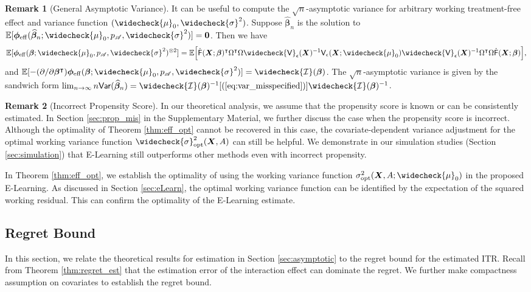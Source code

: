 \documentclass[11pt]{article}
\theoremstyle{definition}
\newtheorem*{rmk}{Remark}
\theoremstyle{remark}
\newcommand{\bX}{\bm{X}}
\newcommand{\bbeta}{\bm{\beta}}
\newcommand{\bphi}{\bm{\phi}}
\newcommand{\bbE}{\mathbb{E}}
\newcommand{\cI}{\mathcal{I}}
\newcommand{\sA}{\mathscr{A}}
\newcommand{\sfF}{\mathsf{F}}
\newcommand{\sfV}{\mathsf{V}}
\newcommand{\sfvar}{\mathsf{Var}}
\newcommand{\bzero}{\mathbf{0}}	%
\newcommand{\eff}{\mathrm{eff}}
\newcommand{\opt}{\mathrm{opt}}
\begin{document}
\begin{rmk}[General Asymptotic Variance]
	It can be useful to compute the $ \sqrt{n} $-asymptotic variance for arbitrary working treatment-free effect and variance function $ (\widecheck{\mu}_{0},\widecheck{\sigma}^{2}) $. Suppose $ \widehat{\bbeta}_{n} $ is the solution to $ \bbE[\bphi_{\eff}(\widehat{\bbeta}_{n};\widecheck{\mu}_{0},p_{\sA},\widecheck{\sigma}^{2})] = \bzero $. Then we have
	\begin{align}
		\bbE[\bphi_{\eff}(\bbeta;\widecheck{\mu}_{0},p_{\sA},\widecheck{\sigma}^{2})^{\otimes 2}] = \bbE\Big[ \dot{\sfF}(\bX;\bbeta)^{\intercal}\Omega^{\intercal}\Omega\widecheck{\sfV}_{\epsilon}(\bX)^{-1} \sfV_{\epsilon}(\bX;\widecheck{\mu}_{0}) \widecheck{\sfV}_{\epsilon}(\bX)^{-1}\Omega^{\intercal}\Omega\dot{\sfF}(\bX;\bbeta) \Big],\label{eq:var_misspecified}
	\end{align}
	and $ \bbE[-(\partial/\partial\bbeta^{\intercal})\bphi_{\eff}(\bbeta;\widecheck{\mu}_{0},p_{\sA},\widecheck{\sigma}^{2})] = \widecheck{\cI}(\bbeta) $. The $ \sqrt{n} $-asymptotic variance is given by the sandwich form $ \lim_{n\to\infty}n\sfvar(\widehat{\bbeta}_{n}) = \widecheck{\cI}(\bbeta)^{-1}[(\ref{eq:var_misspecified})]\widecheck{\cI}(\bbeta)^{-1} $.
\end{rmk}

\begin{rmk}[Incorrect Propensity Score] 
	In our theoretical analysis, we assume that the propensity score is known or can be consistently estimated. In Section \ref{sec:prop_mis} in the Supplementary Material, we further discuss the case when the propensity score is incorrect. Although the optimality of Theorem \ref{thm:eff_opt} cannot be recovered in this case, the covariate-dependent variance adjustment for the optimal working variance function $ \widecheck{\sigma}_{\rm opt}^{2}(\bX,A) $ can still be helpful. We demonstrate in our simulation studies (Section \ref{sec:simulation}) that E-Learning still outperforms other methods even with incorrect propensity.
\end{rmk}

In Theorem \ref{thm:eff_opt}, we establish the optimality of using the working variance function $ \sigma_{\opt}^{2}(\bX,A;\widecheck{\mu}_{0}) $ in the proposed E-Learning. As discussed in Section \ref{sec:eLearn}, the optimal working variance function can be identified by the expectation of the squared working residual. This can confirm the optimality of the E-Learning estimate.

\subsection{Regret Bound}\label{sec:regret}
In this section, we relate the theoretical results for estimation in Section \ref{sec:asymptotic} to the regret bound for the estimated ITR. Recall from Theorem \ref{thm:regret_est} that the estimation error of the interaction effect can dominate the regret. We further make compactness assumption on covariates to establish the regret bound.
\end{document}
